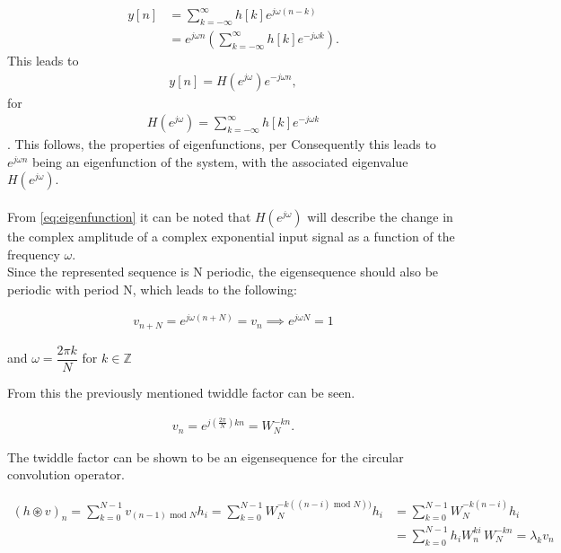 \begin{align*}
y[n] 
&= \sum_{k=-\infty}^{\infty} h[k]e^{j\omega(n-k)} \nonumber \\ 
&= e^{j\omega n} \left(\sum_{k=-\infty}^{\infty} h[k]e^{-j\omega k} \right).
\end{align*}
This leads to
\begin{align}\label{eq:eigenfunction}
y[n] = H(e^{j \omega}) e^{-j\omega n},
\end{align}
for
\begin{align*}
H(e^{j\omega}) = \sum_{k=-\infty}^{\infty} h[k]e^{-j\omega k} 
\end{align*}.
This follows, the properties of eigenfunctions, per 
Consequently this leads to $e^{j\omega n}$ being an eigenfunction of the system, with the associated eigenvalue $H(e^{j\omega})$.
\\\\
From \eqref{eq:eigenfunction} it can be noted that $H(e^{j\omega})$ will describe the change in the complex amplitude of a complex exponential input signal as a function of the frequency $\omega$. \cite{DTSP} 
\\
Since the represented sequence is N periodic, the eigensequence should also be periodic with period N, which leads to the following:

\begin{align*}
	v_{n+N} = e^{j\omega (n+N)} = v_n \implies e^{j\omega N} = 1
\end{align*}

and $\omega = \dfrac{2 \pi k}{N}$ for $k \in \mathbb{Z}$

From this the previously mentioned twiddle factor can be seen.

\begin{align*}
	v_n = e^{j(\frac{2\pi}{N}) kn} = W_N^{-kn}.
\end{align*}\cite{FSP}

The twiddle factor can be shown to be an eigensequence for the circular convolution operator.

\begin{align*}
	(h\circledast v)_n 
	= \sum_{k=0}^{N-1} v_{(n-1)\text{ mod }N}h_i 
	= \sum_{k=0}^{N-1} W_N^{-k((n-i) \text{ mod } N))}h_i
	&= \sum_{k=0}^{N-1} W_N^{-k(n-i)}h_i\\
	&= \sum_{k=0}^{N-1} h_i W_n^{ki} \, W_N^{-kn}
	= \lambda_k v_n
\end{align*}

